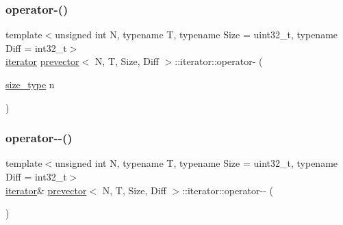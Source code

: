 \mbox{\label{classprevector_1_1iterator_a54022e189e5a6229f5c528fa3cc00f29}} 
\subsubsection{\texorpdfstring{operator-\/()}{operator-()}\hspace{0.1cm}{\footnotesize\ttfamily [2/2]}}
{\footnotesize\ttfamily template$<$unsigned int N, typename T, typename Size = uint32\+\_\+t, typename Diff = int32\+\_\+t$>$ \\
\mbox{\hyperlink{classprevector_1_1iterator}{iterator}} \mbox{\hyperlink{classprevector}{prevector}}$<$ N, T, Size, Diff $>$\+::iterator\+::operator-\/ (\begin{DoxyParamCaption}\item[{\mbox{\hyperlink{classprevector_a7e0da95e6d1c878f6eeb572f4fc12524}{size\+\_\+type}}}]{n }\end{DoxyParamCaption})\hspace{0.3cm}{\ttfamily [inline]}}

\mbox{\label{classprevector_1_1iterator_a5ae1b7e4536071159b91cc82f8aacdfc}} 
\subsubsection{\texorpdfstring{operator-\/-\/()}{operator--()}\hspace{0.1cm}{\footnotesize\ttfamily [1/2]}}
{\footnotesize\ttfamily template$<$unsigned int N, typename T, typename Size = uint32\+\_\+t, typename Diff = int32\+\_\+t$>$ \\
\mbox{\hyperlink{classprevector_1_1iterator}{iterator}}\& \mbox{\hyperlink{classprevector}{prevector}}$<$ N, T, Size, Diff $>$\+::iterator\+::operator-\/-\/ (\begin{DoxyParamCaption}{ }\end{DoxyParamCaption})\hspace{0.3cm}{\ttfamily [inline]}}

\mbox{\label{classprevector_1_1iterator_a55784772609ec1dd13b8b4fa6f11ac82}} 
